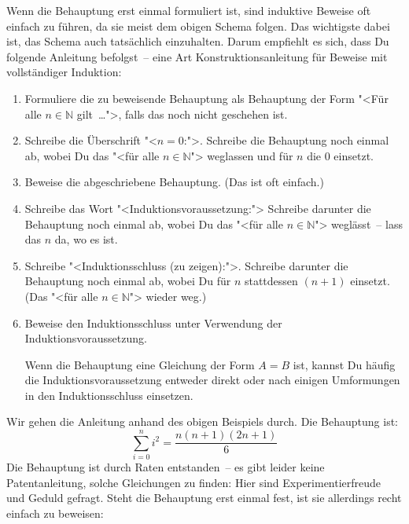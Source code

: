 Wenn die Behauptung erst einmal formuliert ist, sind induktive Beweise
oft einfach zu führen, da sie meist dem obigen Schema folgen.  Das
wichtigste dabei ist, das Schema auch tatsächlich einzuhalten.  Darum
empfiehlt es sich, dass Du folgende Anleitung befolgst~-- eine Art
Konstruktionsanleitung für Beweise mit vollständiger Induktion:
%
\begin{enumerate}
\item Formuliere die zu beweisende Behauptung als Behauptung der
  Form "<Für alle $n\in\mathbb{N}$ gilt~\ldots">, falls das noch nicht
  geschehen ist.
\item Schreibe die Überschrift "<$n = 0$:">. Schreibe die
  Behauptung noch einmal ab, wobei Du das "<für alle $n\in\mathbb{N}$"> weglassen und für $n$ die $0$ einsetzt.
\item Beweise die abgeschriebene Behauptung.  (Das ist oft
  einfach.)
\item Schreibe das Wort "<Induktionsvoraussetzung:"> Schreibe
  darunter die Behauptung noch einmal ab, wobei Du das "<für
  alle $n\in\mathbb{N}$"> weglässt~-- lass das $n$ da, wo es ist.
\item Schreibe "<Induktionsschluss (zu zeigen):">.
  Schreibe darunter die Behauptung noch einmal ab, wobei Du für
  $n$ stattdessen $(n+1)$ einsetzt.  (Das "<für alle
  $n\in\mathbb{N}$"> wieder weg.)
\item Beweise den Induktionsschluss unter Verwendung der
  Induktionsvoraussetzung.  

  Wenn die Behauptung eine Gleichung der Form $A = B$ ist, kannst
  Du häufig die Induktionsvoraussetzung entweder direkt oder nach
  einigen Umformungen in den Induktionsschluss einsetzen.
\end{enumerate}
%
Wir gehen die Anleitung anhand des obigen Beispiels durch.  Die
Behauptung ist:
%
\begin{displaymath}
  \sum_{i=0}^n i^2 = \dfrac{n(n+1)(2n+1)}{6}
\end{displaymath}
%
Die Behauptung ist durch Raten entstanden~-- es gibt leider keine
Patentanleitung, solche Gleichungen zu finden: Hier sind
Experimentierfreude und Geduld gefragt.  Steht die Behauptung erst
einmal fest, ist sie allerdings recht einfach zu beweisen:
%

